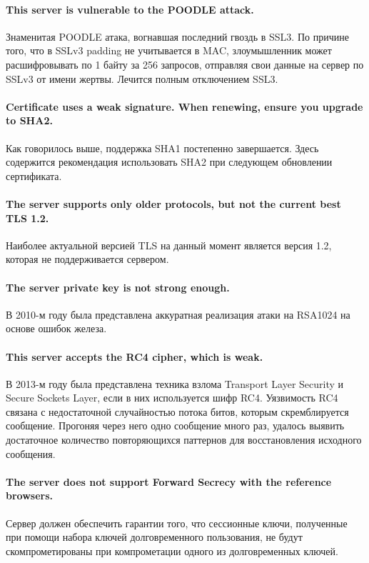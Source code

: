 \paragraph{This server is vulnerable to the POODLE attack.}

Знаменитая POODLE атака, вогнавшая последний гвоздь в SSL3. По причине того, что в SSLv3 padding не учитывается в MAC, злоумышленник может расшифровывать по 1 байту за 256 запросов, отправляя свои данные на сервер по SSLv3 от имени жертвы. Лечится полным отключением SSL3.

\paragraph{Certificate uses a weak signature. When renewing, ensure you upgrade to SHA2.} Как говорилось выше, поддержка SHA1 постепенно завершается. Здесь содержится рекомендация использовать SHA2 при следующем обновлении сертификата. 

\paragraph{The server supports only older protocols, but not the current best TLS 1.2.} Наиболее актуальной версией TLS на данный момент является версия 1.2, которая не поддерживается сервером.

\paragraph{The server private key is not strong enough.} В 2010-м году была представлена аккуратная реализация атаки на RSA1024 на основе ошибок железа.

\paragraph{This server accepts the RC4 cipher, which is weak.} В 2013-м году была представлена техника взлома Transport Layer Security и Secure Sockets Layer, если в них используется шифр RC4. Уязвимость RC4 связана с недостаточной случайностью потока битов, которым скремблируется сообщение. Прогоняя через него одно сообщение много раз, удалось выявить достаточное количество повторяющихся паттернов для восстановления исходного сообщения.

\paragraph{The server does not support Forward Secrecy with the reference browsers.} Сервер должен обеспечить гарантии того, что сессионные ключи, полученные при помощи набора ключей долговременного пользования, не будут скомпрометированы при компрометации одного из долговременных ключей.

